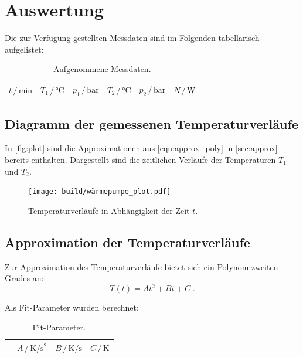 \section{Auswertung} \label{sec:Auswertung}
Die zur Verfügung gestellten Messdaten sind im Folgenden tabellarisch aufgelistet:

\begin{table}[H]
\centering
\caption{Aufgenommene Messdaten.}
\label{tab:Messdaten}
\begin{tabular}{c c c c c c}
\toprule
$t \,/\, \si{\minute}$ &
$T_1 \,/\, \si{\celsius}$ &
$p_1 \,/\, \si{\bar}$ &
$T_2 \,/\, \si{\celsius}$ &
$p_2 \,/\, \si{\bar}$ &
$N \,/\, \si{\watt}$ \\
\midrule

\bottomrule
\end{tabular}
\end{table}

\newpage
\subsection{Diagramm der gemessenen Temperaturverläufe} %
In \autoref{fig:plot} sind die Approximationen aus \autoref{eqn:approx_poly} in \autoref{sec:approx} bereits enthalten.
Dargestellt sind die zeitlichen Verläufe der Temperaturen $T_1$ und $T_2$.

\begin{figure}
  \centering
  \texttt{[image: build/wärmepumpe\_plot.pdf]}
  \caption{Temperaturverläufe in Abhängigkeit der Zeit $t$.}
  \label{fig:plot}
\end{figure}

\subsection{Approximation der Temperaturverläufe} \label{sec:approx} %
Zur Approximation des Temperaturverläufe bietet sich ein Polynom zweiten Grades an:
\begin{equation}
  \label{eqn:approx_poly}
  T(t) = At^2 + Bt + C \; .
\end{equation}

Als Fit-Parameter wurden berechnet:

\begin{table}[H]
\centering
\caption{Fit-Parameter.}
\label{tab:fit_params}
\begin{tabular}{c c c c}
\toprule
&
$A \,/\, \si{\kelvin\per\square\second}$ &
$B \,/\, \si{\kelvin\per\second}$ &
$C \,/\, \si{\kelvin}$ \\
\midrule

\bottomrule
\end{tabular}
\end{table}

